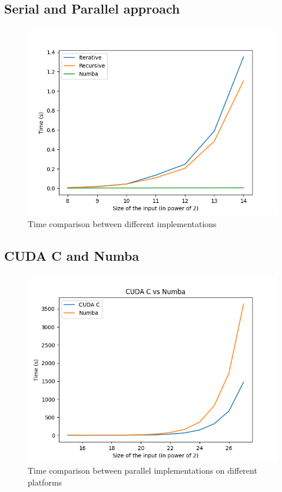 \documentclass[a4paper, 12pt, oneside]{article}
\begin{document}
\subsection{Serial and Parallel approach}

\begin{figure}[!h]
  \includegraphics[width=400pt]{images/cpu_vs_gpu.png}
  \caption{Time comparison between different implementations}
\end{figure}

\subsection{CUDA C and Numba}

\begin{figure}[!h]
  \includegraphics[width=400pt]{images/cpp_vs_py.png}
  \caption{Time comparison between parallel implementations on different platforms}
\end{figure}
\end{document}
